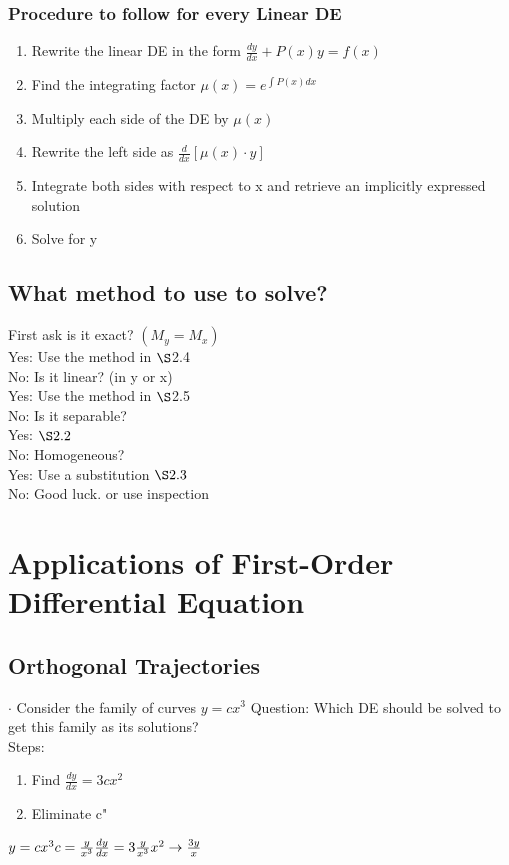 \documentclass{article}
\begin{document}
\subsubsection{Procedure to follow for every Linear DE}
\begin{enumerate}
    \item Rewrite the linear DE in the form $\frac{dy}{dx}+P(x)y=f(x)$
    \item Find the integrating factor $\mu(x)=e^{\int P(x)dx}$
    \item Multiply each side of the DE by $\mu(x)$
    \item Rewrite the left side as $\frac{d}{dx} \left[\mu(x)\cdot y\right]$
    \item Integrate both sides with respect to x and retrieve an implicitly expressed solution
    \item Solve for y
\end{enumerate}
\subsection{What method to use to solve?}
First ask is it exact? $(M_y=M_x)$
\\Yes: Use the method in $\S$2.4
\\No: Is it linear? (in y or x)
\\Yes: Use the method in $\S$2.5
\\No: Is it separable?
\\Yes: $\S 2.2$
\\No: Homogeneous?
\\Yes: Use a substitution $\S 2.3$
\\No: Good luck. or use inspection\pagebreak
\section{Applications of First-Order Differential Equation}
\subsection{Orthogonal Trajectories}
$\cdot$ Consider the family of curves $y=cx^3$
Question: Which DE should be solved to get this family as its solutions?
\\Steps:
\begin{enumerate}
    \item Find $\frac{dy}{dx} =3cx^2$
    \item Eliminate c"
\end{enumerate} $y=cx^3 c=\frac{y}{x^3} \\ \frac{dy}{dx}=3\frac{y}{x^3}x^2 \rightarrow \frac{3y}{x}$
\end{document}
